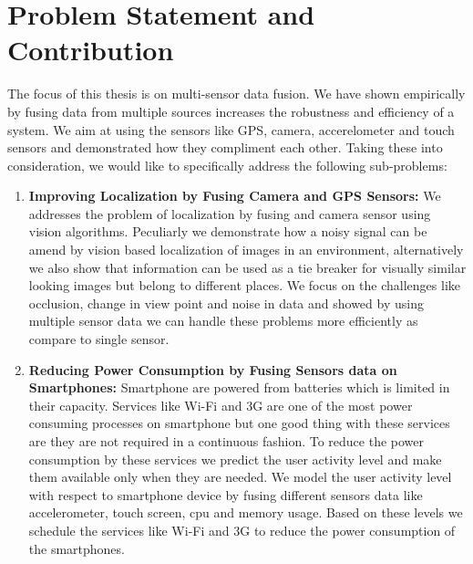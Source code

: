\section{Problem Statement and Contribution}
\label{sec_prob_statmnt_contrib}
The focus of this thesis is on multi-sensor data fusion. We have shown empirically by fusing data from multiple sources increases the robustness and efficiency of a system. We aim at using the sensors like GPS, camera, accerelometer and touch sensors and demonstrated how they compliment each other. Taking these into consideration, we would like to specifically address the following sub-problems:
\begin{enumerate}
\item \textbf{Improving Localization by Fusing Camera and GPS Sensors:} We addresses the problem of localization by fusing \gps and camera sensor using vision algorithms. Peculiarly we demonstrate how a noisy \gps signal can be amend by vision based localization of images in an environment, alternatively we also show that \gps information can be used as a tie breaker for visually similar looking images but belong to different places. We focus on the challenges like occlusion, change in view point and noise in \gps data and showed by using multiple sensor data we can handle these problems more efficiently as compare to single sensor.  


\item \textbf{Reducing Power Consumption by Fusing Sensors data on Smartphones:} Smartphone are powered from batteries which is limited in their capacity. Services like Wi-Fi and 3G are one of the most power consuming processes on smartphone but one good thing with these services are they are not required in a continuous fashion. To reduce the power consumption by these services we predict the user activity level and make them available only when they are needed. We model the user activity level with respect to smartphone device by fusing different sensors data like accelerometer, touch screen, cpu and memory usage. Based on these levels we schedule the services like Wi-Fi and 3G to reduce the power consumption of the smartphones.
\end{enumerate}

